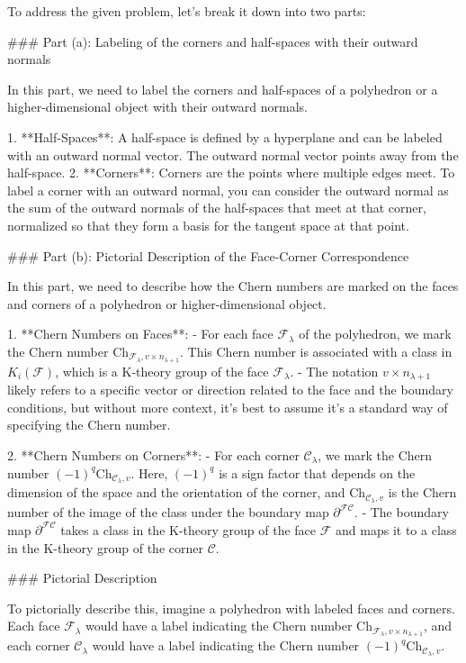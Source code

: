 To address the given problem, let's break it down into two parts:

### Part (a): Labeling of the corners and half-spaces with their outward normals

In this part, we need to label the corners and half-spaces of a polyhedron or a higher-dimensional object with their outward normals.

1. **Half-Spaces**: A half-space is defined by a hyperplane and can be labeled with an outward normal vector. The outward normal vector points away from the half-space.
2. **Corners**: Corners are the points where multiple edges meet. To label a corner with an outward normal, you can consider the outward normal as the sum of the outward normals of the half-spaces that meet at that corner, normalized so that they form a basis for the tangent space at that point.

### Part (b): Pictorial Description of the Face-Corner Correspondence

In this part, we need to describe how the Chern numbers are marked on the faces and corners of a polyhedron or higher-dimensional object.

1. **Chern Numbers on Faces**:
   - For each face \(\mathcal{F}_\lambda\) of the polyhedron, we mark the Chern number \(\text{Ch}_{\mathcal{F}_\lambda, v \times n_{\lambda+1}}\). This Chern number is associated with a class in \(K_i(\mathcal{F})\), which is a K-theory group of the face \(\mathcal{F}_\lambda\).
   - The notation \(v \times n_{\lambda+1}\) likely refers to a specific vector or direction related to the face and the boundary conditions, but without more context, it's best to assume it's a standard way of specifying the Chern number.

2. **Chern Numbers on Corners**:
   - For each corner \(\mathcal{C}_\lambda\), we mark the Chern number \((-1)^q \text{Ch}_{\mathcal{C}_\lambda, v}\). Here, \((-1)^q\) is a sign factor that depends on the dimension of the space and the orientation of the corner, and \(\text{Ch}_{\mathcal{C}_\lambda, v}\) is the Chern number of the image of the class under the boundary map \(\partial^{\mathcal{F} \mathcal{C}}\).
   - The boundary map \(\partial^{\mathcal{F} \mathcal{C}}\) takes a class in the K-theory group of the face \(\mathcal{F}\) and maps it to a class in the K-theory group of the corner \(\mathcal{C}\).

### Pictorial Description

To pictorially describe this, imagine a polyhedron with labeled faces and corners. Each face \(\mathcal{F}_\lambda\) would have a label indicating the Chern number \(\text{Ch}_{\mathcal{F}_\lambda, v \times n_{\lambda+1}}\), and each corner \(\mathcal{C}_\lambda\) would have a label indicating the Chern number \((-1)^q \text{Ch}_{\mathcal{C}_\lambda, v}\).


